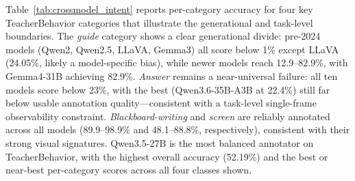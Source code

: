 \documentclass{ieeeaccess}
\begin{document}
\begin{table}[!t]
\caption{Ten-model cross-model robustness check of validation-set annotation
accuracy under a common bbox-crop and index-only prompting protocol.
Abbreviations: Q3.5-27B = Qwen3.5-27B; Q3.5-35B = Qwen3.5-35B-A3B (MoE);
Q3.6-27B = Qwen3.6-27B; Q3.6-35B = Qwen3.6-35B-A3B (MoE, FP8);
G4-26B = Gemma4-26B-A4B-it (MoE); G4-31B = Gemma4-31B-it.
Values are bbox-level pseudo-label accuracy (\%). Best per dataset in bold.}
\label{tab:crossmodel_overall}
\centering
\scriptsize
{}
\normalsize
\end{table}

Table~\ref{tab:crossmodel_intent} reports per-category accuracy for
four key TeacherBehavior categories that illustrate the generational and
task-level boundaries.
The \textit{guide} category shows a clear generational divide: pre-2024
models (Qwen2, Qwen2.5, LLaVA, Gemma3) all score below 1\% except LLaVA
(24.05\%, likely a model-specific bias), while newer models reach
12.9--82.9\%, with Gemma4-31B achieving 82.9\%.
\textit{Answer} remains a near-universal failure: all ten models score
below 23\%, with the best (Qwen3.6-35B-A3B at 22.4\%) still far below
usable annotation quality---consistent with a task-level single-frame
observability constraint.
\textit{Blackboard-writing} and \textit{screen} are reliably annotated
across all models (89.9--98.9\% and 48.1--88.8\%, respectively),
consistent with their strong visual signatures.
Qwen3.5-27B is the most balanced annotator on TeacherBehavior, with the
highest overall accuracy (52.19\%) and the best or near-best per-category
scores across all four classes shown.
\end{document}
